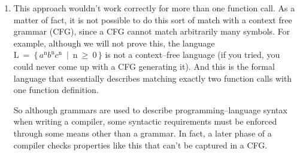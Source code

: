 \documentclass[11pt]{article}
\begin{document}
\begin{enumerate}
\begin{enumerate}
            \item This approach wouldn't work correctly for more than one
                  function call.  As a matter of fact, it is not possible to
                  do this sort of match with a context free grammar (CFG),
                  since a CFG cannot match arbitrarily many symbols.  For
                  example, although we will not prove this, the language
                  \(
                    \mathrm{
                      L \: = \: \{ \,
                        {\mathit{a}^n}{\mathit{b}^n}{\mathit{c}^n} \: \mid
                          \: n \: \geq \: 0 \,\}
                    }
                  \)
                  is not a context--free language (if you tried, you could
                  never come up with a CFG generating it).  And this is the
                  formal language that essentially describes matching
                  exactly two function calls with one function definition.

                  So although grammars are used to describe
                  programming--language syntax when writing a compiler, some
                  syntactic requirements must be enforced through some means
                  other than a grammar.  In fact, a later phase of a
                  compiler checks properties like this that can't be
                  captured in a CFG.

          \end{enumerate}


\end{enumerate}
\end{document}
